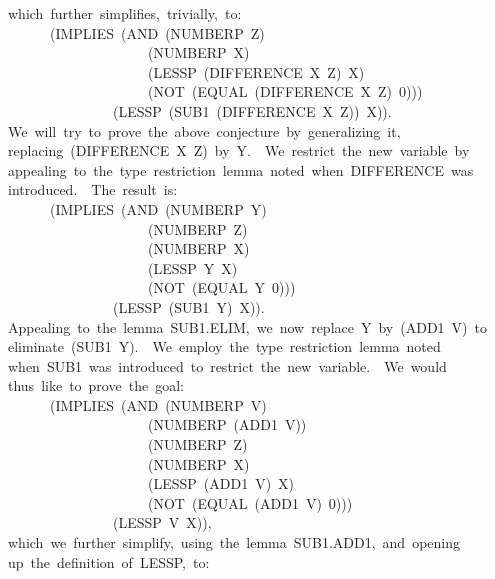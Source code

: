 \documentclass[10pt]{book}
\newenvironment{pubasis}{\begin{flushleft}}{\end{flushleft}}
\begin{document}
\begin{pubasis}
~~which~further~simplifies,~trivially,~to:\\

~~~~~~~~(IMPLIES~(AND~(NUMBERP~Z)\\
~~~~~~~~~~~~~~~~~~~~~~(NUMBERP~X)\\
~~~~~~~~~~~~~~~~~~~~~~(LESSP~(DIFFERENCE~X~Z)~X)\\
~~~~~~~~~~~~~~~~~~~~~~(NOT~(EQUAL~(DIFFERENCE~X~Z)~0)))\\
~~~~~~~~~~~~~~~~~(LESSP~(SUB1~(DIFFERENCE~X~Z))~X)).\\

~~We~will~try~to~prove~the~above~conjecture~by~generalizing~it,\\
~~replacing~(DIFFERENCE~X~Z)~by~Y.~~We~restrict~the~new~variable~by\\
~~appealing~to~the~type~restriction~lemma~noted~when~DIFFERENCE~was\\
~~introduced.~~The~result~is:\\

~~~~~~~~(IMPLIES~(AND~(NUMBERP~Y)\\
~~~~~~~~~~~~~~~~~~~~~~(NUMBERP~Z)\\
~~~~~~~~~~~~~~~~~~~~~~(NUMBERP~X)\\
~~~~~~~~~~~~~~~~~~~~~~(LESSP~Y~X)\\
~~~~~~~~~~~~~~~~~~~~~~(NOT~(EQUAL~Y~0)))\\
~~~~~~~~~~~~~~~~~(LESSP~(SUB1~Y)~X)).\\

~~Appealing~to~the~lemma~SUB1.ELIM,~we~now~replace~Y~by~(ADD1~V)~to\\
~~eliminate~(SUB1~Y).~~We~employ~the~type~restriction~lemma~noted\\
~~when~SUB1~was~introduced~to~restrict~the~new~variable.~~We~would\\
~~thus~like~to~prove~the~goal:\\

~~~~~~~~(IMPLIES~(AND~(NUMBERP~V)\\
~~~~~~~~~~~~~~~~~~~~~~(NUMBERP~(ADD1~V))\\
~~~~~~~~~~~~~~~~~~~~~~(NUMBERP~Z)\\
~~~~~~~~~~~~~~~~~~~~~~(NUMBERP~X)\\
~~~~~~~~~~~~~~~~~~~~~~(LESSP~(ADD1~V)~X)\\
~~~~~~~~~~~~~~~~~~~~~~(NOT~(EQUAL~(ADD1~V)~0)))\\
~~~~~~~~~~~~~~~~~(LESSP~V~X)),\\

~~which~we~further~simplify,~using~the~lemma~SUB1.ADD1,~and~opening\\
~~up~the~definition~of~LESSP,~to:\\


\end{pubasis}
\end{document}
